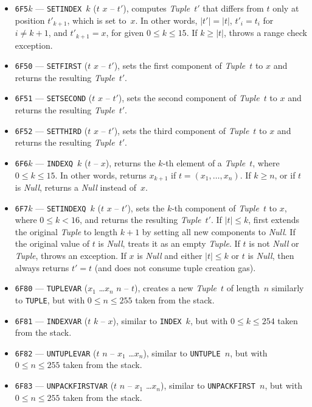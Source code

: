 \documentclass[12pt,oneside]{article}
\begin{document}
\begin{itemize}
\item {\tt 6F5$k$} --- {\tt SETINDEX $k$} ($t$ $x$ -- $t'$), computes {\em Tuple\/}~$t'$ that differs from $t$ only at position $t'_{k+1}$, which is set to~$x$. In other words, $|t'|=|t|$, $t'_i=t_i$ for $i\neq k+1$, and $t'_{k+1}=x$, for given $0\leq k\leq15$. If $k\geq|t|$, throws a range check exception.
\item {\tt 6F50} --- {\tt SETFIRST} ($t$ $x$ -- $t'$), sets the first component of {\em Tuple\/}~$t$ to $x$ and returns the resulting {\em Tuple\/}~$t'$.
\item {\tt 6F51} --- {\tt SETSECOND} ($t$ $x$ -- $t'$), sets the second component of {\em Tuple\/}~$t$ to $x$ and returns the resulting {\em Tuple\/}~$t'$.
\item {\tt 6F52} --- {\tt SETTHIRD} ($t$ $x$ -- $t'$), sets the third component of {\em Tuple\/}~$t$ to $x$ and returns the resulting {\em Tuple\/}~$t'$.
\item {\tt 6F6$k$} --- {\tt INDEXQ $k$} ($t$ -- $x$), returns the $k$-th element of a {\em Tuple\/}~$t$, where $0\leq k\leq 15$. In other words, returns $x_{k+1}$ if $t=(x_1,\ldots,x_n)$. If $k\geq n$, or if $t$ is {\em Null}, returns a {\em Null\/} instead of~$x$.
\item {\tt 6F7$k$} --- {\tt SETINDEXQ $k$} ($t$ $x$ -- $t'$), sets the $k$-th component of {\em Tuple\/}~$t$ to $x$, where $0\leq k<16$, and returns the resulting {\em Tuple\/}~$t'$. If $|t|\leq k$, first extends the original {\em Tuple\/} to length $k+1$ by setting all new components to {\em Null}. If the original value of $t$ is {\em Null}, treats it as an empty {\em Tuple}. If $t$ is not {\em Null\/} or {\em Tuple}, throws an exception. If $x$ is {\em Null\/} and either $|t|\leq k$ or $t$ is {\em Null}, then always returns $t'=t$ (and does not consume tuple creation gas).
\item {\tt 6F80} --- {\tt TUPLEVAR} ($x_1$ \dots $x_n$ $n$ -- $t$), creates a new {\em Tuple\/}~$t$ of length~$n$ similarly to {\tt TUPLE}, but with $0\leq n\leq 255$ taken from the stack.
\item {\tt 6F81} --- {\tt INDEXVAR} ($t$ $k$ -- $x$), similar to {\tt INDEX $k$}, but with $0\leq k\leq 254$ taken from the stack.
\item {\tt 6F82} --- {\tt UNTUPLEVAR} ($t$ $n$ -- $x_1$ \dots $x_n$), similar to {\tt UNTUPLE $n$}, but with $0\leq n\leq 255$ taken from the stack.
\item {\tt 6F83} --- {\tt UNPACKFIRSTVAR} ($t$ $n$ -- $x_1$ \dots $x_n$), similar to {\tt UNPACKFIRST $n$}, but with $0\leq n\leq 255$ taken from the stack.

\end{itemize}
\end{document}
